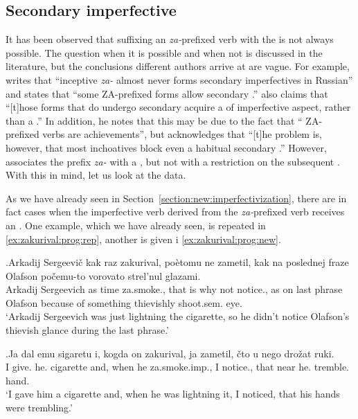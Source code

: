 \subsection{Secondary imperfective}
It has been observed that suffixing an  \textit{za-}prefixed verb with the  is not always possible. The question when it is possible and when not is discussed in the literature, but the conclusions different authors arrive at are vague. For example, \citet[230]{Svenonius:04b} writes that ``inceptive \textit{za-} almost never forms secondary imperfectives in Russian'' and \citet[220]{Braginsky:08} states that ``some  ZA-prefixed forms allow secondary .'' \citet[231]{Braginsky:08} also claims that ``[t]hose  forms that do undergo secondary  acquire a  of imperfective aspect, rather than a .'' In addition, he notes that this may be due to the fact that `` ZA-prefixed verbs are achievements'', but acknowledges that ``[t]he problem is, however, that most inchoatives block even a habitual secondary .'' However, \citet{Tatevosov:09} associates the  prefix \textit{za-} with a , but not with a restriction on the subsequent . With this in mind, let us look at the data. 

As we have already seen in Section~\ref{section:new:imperfectivization}, there are in fact cases when the imperfective verb derived from the \textit{za-}prefixed  verb receives an . One example, which we have already seen, is repeated in \ref{ex:zakurival:prog:rep}, another is given i \ref{ex:zakurival:prog:new}.

\exg.\label{ex:zakurival:prog:rep}Arkadij Sergeevi\v{c} kak raz zakurival, po\`{e}tomu ne zametil, kak na poslednej fraze Olafson po\v{c}emu-to vorovato strel'nul glazami.\\
Arkadij Sergeevich as time za.smoke., {that is why} not notice., as on last phrase Olafson {because of something} thievishly shoot.sem. eye.\\
\trans `Arkadij Sergeevich was just lightning the cigarette, so he didn't notice Olafson's thievish glance during the last phrase.'

\exg.\label{ex:zakurival:prog:new}Ja dal emu sigaretu i, kogda on zakurival, ja zametil, \v{c}to u nego dro\v{z}at ruki.\\
I give. he. cigarette and, when he za.smoke.imp., I notice., that near he. tremble. hand.\\
\trans `I gave him a cigarette and, when he was lightning it, I noticed, that his hands were trembling.'\\

